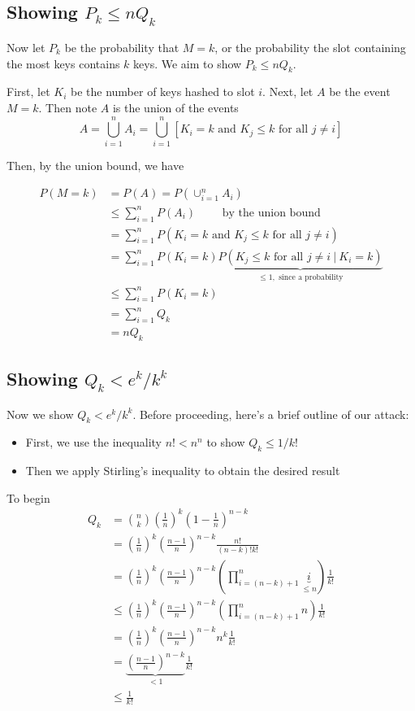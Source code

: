 \documentclass[paper=a4, fontsize=11pt]{scrartcl} %
\numberwithin{equation}{section} %
\numberwithin{figure}{section} %
\numberwithin{table}{section} %
\begin{document}
\subsection{Showing $P_k \leq n Q_k$}

Now let $P_k$ be the probability that $M = k$, or the probability the slot containing the most keys contains $k$ keys. We aim to show $P_k \leq n Q_k$.

First, let $K_i$ be the number of keys hashed to slot $i$. Next, let $A$ be the event $M = k$. Then note $A$ is the union of the events
\[ A = \bigcup_{i = 1}^n A_i = \bigcup_{i = 1}^n \left[K_i = k \textrm{ and } K_j \leq k \textrm{ for all } j \ne i \right]\]

Then, by the union bound, we have

\begin{align*}
P(M = k) &= P(A) = P(\cup_{i = 1}^n A_i) \\
	&\leq \sum_{i = 1}^n P(A_i) \qquad{} \textrm{ by the union bound}\\	
 	&= \sum_{i = 1}^n P(K_i = k \textrm{ and } K_j \leq k \textrm{ for all } j \ne i) \\
 	&= \sum_{i = 1}^n P(K_i = k)\underbrace{P (K_j \leq k \textrm{ for all } j \ne i ~\big|~ K_i = k)}_{\leq 1,\textrm{ since a probability}} \\
	& \leq \sum_{i = 1}^n P(K_i = k) \\
	&= \sum_{i = 1}^n Q_k \\
	&= n Q_k
\end{align*}

\subsection{Showing $Q_k < e^k/k^k$}

Now we show $Q_k < e^k / k^k$. Before proceeding, here's a brief outline of our attack:
\begin{itemize}
\item First, we use the inequality $n! < n^n$ to show $Q_k \leq 1/k!$
\item Then we apply Stirling's inequality to obtain the desired result
\end{itemize}
To begin
\begin{align*}
Q_k &= {n \choose k} \left(\frac{1}{n}\right)^k \left(1 - \frac{1}{n}\right)^{n - k} \\
	&= \left(\frac{1}{n}\right)^k \left(\frac{n-1}{n}\right)^{n - k} \frac{n!}{(n-k)! k !} \\
	&= \left(\frac{1}{n}\right)^k \left(\frac{n-1}{n}\right)^{n - k}\left(\prod_{i = (n - k) + 1}^n \underbrace{i}_{\leq n}\right)\frac{1}{k!} \\
	&\leq \left(\frac{1}{n}\right)^k \left(\frac{n-1}{n}\right)^{n - k}\left(\prod_{i = (n - k) + 1}^n n \right)\frac{1}{k!} \\
	&= \left(\frac{1}{n}\right)^k \left(\frac{n-1}{n}\right)^{n - k} n^k \frac{1}{k!} \\
	&= \underbrace{\left(\frac{n-1}{n}\right)^{n - k}}_{<1} \frac{1}{k!} \\
	&\leq \frac{1}{k!} 
\end{align*}
\end{document}
